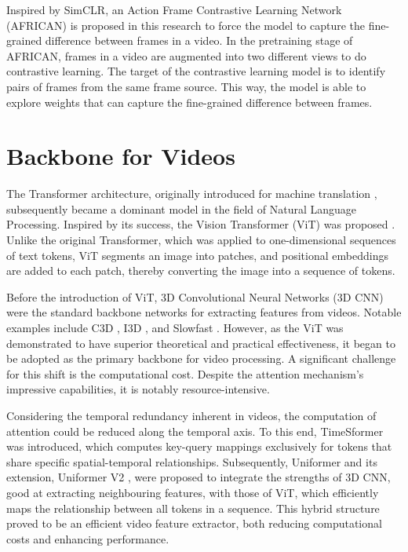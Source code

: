 Inspired by SimCLR, an Action Frame Contrastive Learning Network (AFRICAN) is proposed in this research to force the model to capture the fine-grained difference between frames in a video. In the pretraining stage of AFRICAN, frames in a video are augmented into two different views to do contrastive learning. The target of the contrastive learning model is to identify pairs of frames from the same frame source. This way, the model is able to explore weights that can capture the fine-grained difference between frames. 

\section{Backbone for Videos}
The Transformer architecture, originally introduced for machine translation \parencite{vaswani2017attention}, subsequently became a dominant model in the field of Natural Language Processing. Inspired by its success, the Vision Transformer (ViT) was proposed \parencite{dosovitskiy2020image}. Unlike the original Transformer, which was applied to one-dimensional sequences of text tokens, ViT segments an image into patches, and positional embeddings are added to each patch, thereby converting the image into a sequence of tokens.

Before the introduction of ViT, 3D Convolutional Neural Networks (3D CNN) were the standard backbone networks for extracting features from videos. Notable examples include C3D \parencite{tran2015learning}, I3D \parencite{carreira2017quo}, and Slowfast \parencite{feichtenhofer2019slowfast}. However, as the ViT was demonstrated to have superior theoretical and practical effectiveness, it began to be adopted as the primary backbone for video processing. A significant challenge for this shift is the computational cost. Despite the attention mechanism's impressive capabilities, it is notably resource-intensive.

Considering the temporal redundancy inherent in videos, the computation of attention could be reduced along the temporal axis. To this end, TimeSformer \parencite{bertasius2021space} was introduced, which computes key-query mappings exclusively for tokens that share specific spatial-temporal relationships. Subsequently, Uniformer \parencite{li2022uniformer} and its extension, Uniformer V2 \parencite{li2022uniformerv2}, were proposed to integrate the strengths of 3D CNN, good at extracting neighbouring features, with those of ViT, which efficiently maps the relationship between all tokens in a sequence. This hybrid structure proved to be an efficient video feature extractor, both reducing computational costs and enhancing performance. 

